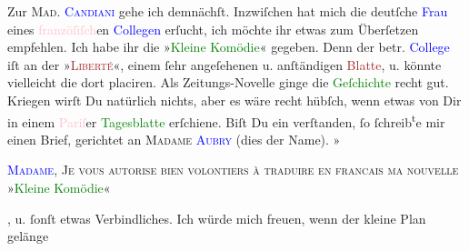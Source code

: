            \pstart
           {\pb}Zur \textsc{Mad. \textcolor{blue}{Candiani}{}\ledrightnote{\textcolor{blue}{Regina Candiani}}} gehe ich demnächſt. Inzwiſchen hat mich die deutſche \textcolor{blue}{Frau}{} eines \textcolor{pink}{franzöſiſch}{}en \textcolor{blue}{Collegen}{} erſucht, ich möchte ihr etwas zum
               Überſetzen empfehlen. Ich habe ihr die »\textcolor{green}{Kleine
                  Komödie}{}\ledrightnote{\textcolor{green}{Die kleine Komödie}}« gegeben. Denn der betr. \textcolor{blue}{College}{} iſt an der »\textsc{\textcolor{brown}{Liberté}{}\ledrightnote{\textcolor{brown}{La Liberté}}}«, einem ſehr angeſehenen u. anſtändigen \textcolor{brown}{Blatte}{}, u. könnte vielleicht die \label{K_L02748-8v}\label{K_L02748-8h} dort placiren. Als
               Zeitungs-Novelle ginge die \textcolor{green}{Geſchichte}{} recht gut. Kriegen wirſt {\pb}Du
               natürlich nichts, aber es wäre recht hübſch, wenn etwas von Dir in einem \textcolor{pink}{Pariſ}{}\ledrightnote{\textcolor{pink}{Paris}}er \textcolor{green}{Tagesblatte}{} erſchiene. Biſt Du ein verſtanden, ſo ſchreib\substVorne{}\textsuperscript{t}\substDazwischen{}e\substHinten{} mir einen Brief, gerichtet an \textsc{Madame \textcolor{blue}{Aubry}{}\ledrightnote{\textcolor{blue}{[MMe. Georges] Aubry}}} (dies der Name). »\begin{otherlanguage}{french}\textsc{\textcolor{blue}{Madame}{}, Je vous
                     autorise bien volontiers à traduire en francais ma nouvelle } »\textcolor{green}{Kleine Komödie}{}\ledrightnote{\textcolor{green}{Die kleine Komödie}}«\end{otherlanguage}, u. ſonſt etwas
               Verbindliches. Ich würde mich freuen, wenn der kleine Plan gelänge{\dotssix}\pend
